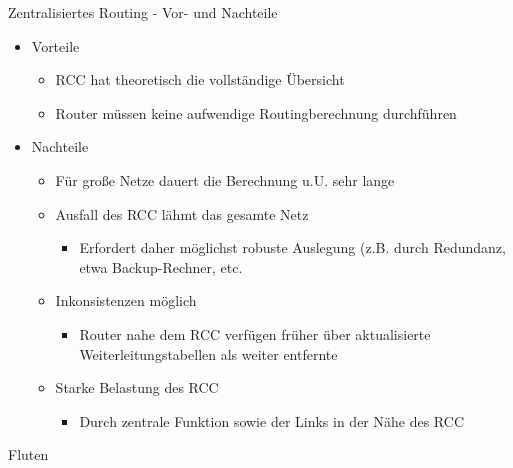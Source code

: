       Zentralisiertes Routing - Vor- und Nachteile
      \begin{itemize}
        \item Vorteile
          \begin{itemize}
            \item RCC hat theoretisch die vollständige Übersicht
            \item Router müssen keine aufwendige Routingberechnung durchführen
          \end{itemize}
        \item Nachteile
          \begin{itemize}
            \item Für große Netze dauert die Berechnung u.U. sehr lange
            \item Ausfall des RCC lähmt das gesamte Netz
              \begin{itemize}
                \item Erfordert daher möglichst robuste Auslegung (z.B. durch Redundanz, etwa 
                  Backup-Rechner, etc.
              \end{itemize}
            \item Inkonsistenzen möglich
              \begin{itemize}
                \item Router nahe dem RCC verfügen früher über aktualisierte Weiterleitungstabellen
                  als weiter entfernte
              \end{itemize}
            \item Starke Belastung des RCC
              \begin{itemize}
                \item Durch zentrale Funktion sowie der Links in der Nähe des RCC
              \end{itemize}
          \end{itemize}
      \end{itemize}
      Fluten
